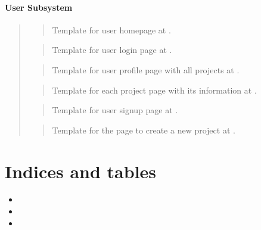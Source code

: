 \documentclass[a4paper,12pt,english]{sphinxmanual}
\begin{document}
\subsubsection{User Subsystem}
\label{\detokenize{templates:user-subsystem}}\begin{quote}

\begin{quote}

Template for user homepage at .
\end{quote}

\begin{quote}

Template for user login page at .
\end{quote}

\begin{quote}

Template for user profile page with all projects at .
\end{quote}

\begin{quote}

Template for each project page with its information at .
\end{quote}

\begin{quote}

Template for user signup page at .
\end{quote}

\begin{quote}

Template for the page to create a new project at .
\end{quote}
\end{quote}


\chapter{Indices and tables}
\label{\detokenize{index:indices-and-tables}}\begin{itemize}
\item {} 

\item {} 

\item {} 

\end{itemize}
\end{document}
